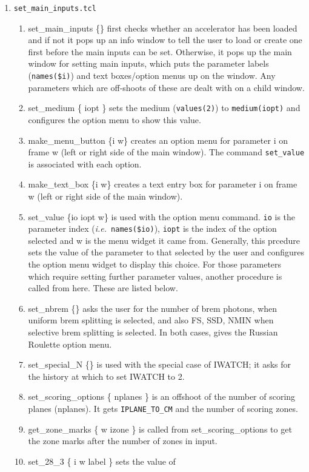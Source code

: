 \documentclass[12pt]{book}
\newcommand{\ie}{{\em i.e.}}
\begin{document}
\begin{enumerate}
\item {\tt set\_main\_inputs.tcl}
\begin{enumerate}
\item {\sf set\_main\_inputs \{\}} first checks whether an accelerator has
been loaded and if not it pops up an info window to tell the user to
load or create one first before the main inputs can be set.  Otherwise,
it pops up the main window for setting main inputs, which puts the
parameter labels ({\tt names(\$i)}) and text boxes/option menus up on
the window.  Any parameters which are off-shoots of these are dealt with
on a child window.
\item {\sf set\_medium \{ iopt \}} sets the medium ({\tt values(2)}) to
{\tt medium(iopt)} and configures the option menu to show this value.
\item {\sf make\_menu\_button \{i w\}} creates an option menu for parameter i
on frame w (left or right side of the main window).  The command
{\tt set\_value} is associated with each option.
\item {\sf make\_text\_box \{i w\}} creates a text entry box for parameter i
on frame w (left or right side of the main window).
\item {\sf set\_value \{io iopt w\}} is used with the option menu
command.  {\tt io}
is the parameter index (\ie~{\tt names(\$io)}), {\tt iopt} is the index
of the option selected and w is the menu widget it came from.
Generally, this prcedure sets the value of the parameter to that
selected by the user and configures the option menu widget to display
this choice.  For those parameters which require setting further
parameter values, another procedure is called from here.  These are
listed below.
\item {\sf set\_nbrem \{\}} asks the user for the number of brem photons, when
uniform brem splitting is selected, and also FS, SSD, NMIN when
selective brem splitting is selected.  In both cases, gives the Russian
Roulette option menu.
\item {\sf set\_special\_N \{\}} is used with the special case of IWATCH; it
asks for the history at which to set IWATCH to 2.
\item {\sf set\_scoring\_options \{ nplanes \}} is an offshoot of the number
of scoring planes (nplanes).  It gets {\tt IPLANE\_TO\_CM} and the number of
scoring zones.
\item {\sf get\_zone\_marks \{ w izone \}} is called from
{\sf set\_scoring\_options} to get the zone marks after the number of zones in
input.
\item {\sf set\_28\_3 \{ i w label \}} sets the value of

\end{enumerate}
\end{enumerate}
\end{document}
